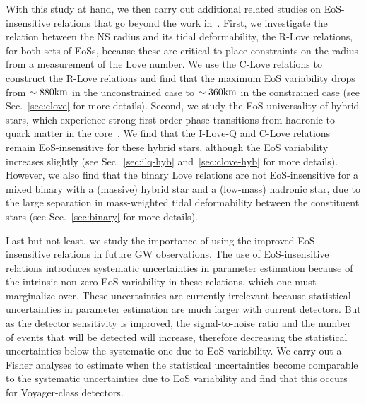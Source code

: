 \documentclass[prd,twocolumn,nofootinbib,superscriptaddress,amsmath,amssymb]{revtex4-1}
\begin{document}
With this study at hand, we then carry out additional related studies on EoS-insensitive relations that go beyond the work in~\cite{Yagi:binLove,Yagi:ILQ}. First, we investigate the relation between the NS radius and its tidal deformability, the R-Love relations, for both sets of EoSs, because these are critical to place constraints on the radius from a measurement of the Love number.  We use the C-Love relations to construct the R-Love relations and find that the maximum EoS variability drops from $\sim 880 {\rm{km}}$ in the unconstrained case to $\sim 360 {\rm{km}}$ in the constrained case (see Sec.~\ref{sec:clove} for more details). Second, we study the EoS-universality of hybrid stars, which experience strong first-order phase transitions from hadronic to quark matter in the core~\cite{Paschalidis2018}. We find that the I-Love-Q and C-Love relations remain EoS-insensitive for these hybrid stars, although the EoS variability increases slightly (see Sec.~\ref{sec:ilq-hyb} and~\ref{sec:clove-hyb} for more details). However, we also find that the binary Love relations are not EoS-insensitive for a mixed binary with a (massive) hybrid star and a (low-mass) hadronic star, due to the large separation in mass-weighted tidal deformability between the constituent stars (see Sec.~\ref{sec:binary} for more details).

Last but not least, we study the importance of using the improved EoS-insensitive relations in future GW observations. The use of EoS-insensitive relations introduces systematic uncertainties in parameter estimation because of the intrinsic non-zero EoS-variability in these relations, which one must marginalize over. These uncertainties are currently irrelevant because statistical uncertainties in parameter estimation are much larger with current detectors. But as the detector sensitivity is improved, the signal-to-noise ratio and the number of events that will be detected will increase, therefore decreasing the statistical uncertainties below the systematic one due to EoS variability. We carry out a Fisher analyses to estimate when the statistical uncertainties become comparable to the systematic uncertainties due to EoS variability and find that this occurs for Voyager-class detectors. 
\end{document}
